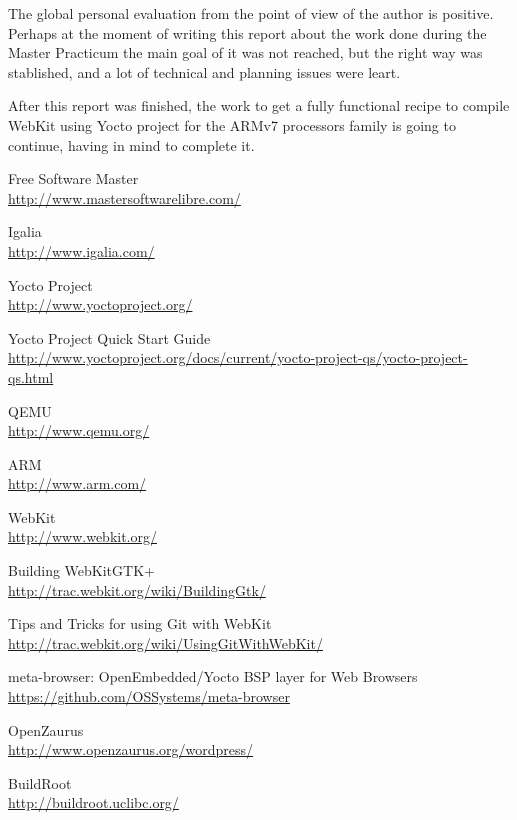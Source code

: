 \documentclass[a4paper,11pt,openany]{report}
\begin{document}
The global personal evaluation from the point of view of the author is positive. Perhaps at the moment of writing this report about the work done during the Master Practicum the main goal of it was not reached, but the right way was stablished, and a lot of technical and planning issues were leart.

After this report was finished, the work to get a fully functional recipe to compile WebKit using Yocto project for the ARMv7 processors family is going to continue, having in mind to complete it.

\begin{thebibliography}{ZZ}

Free Software Master\\
\url{http://www.mastersoftwarelibre.com/}

Igalia\\
\url{http://www.igalia.com/}

Yocto Project\\
\url{http://www.yoctoproject.org/}

Yocto Project Quick Start Guide\\
\url{http://www.yoctoproject.org/docs/current/yocto-project-qs/yocto-project-qs.html}

QEMU\\
\url{http://www.qemu.org/}

ARM\\
\url{http://www.arm.com/}

WebKit\\
\url{http://www.webkit.org/}

Building WebKitGTK+\\
\url{http://trac.webkit.org/wiki/BuildingGtk/}

Tips and Tricks for using Git with WebKit\\
\url{http://trac.webkit.org/wiki/UsingGitWithWebKit/}

meta-browser: OpenEmbedded/Yocto BSP layer for Web Browsers\\
\url{https://github.com/OSSystems/meta-browser}

OpenZaurus\\
\url{http://www.openzaurus.org/wordpress/}

BuildRoot\\
\url{http://buildroot.uclibc.org/}


\end{thebibliography}
\end{document}
